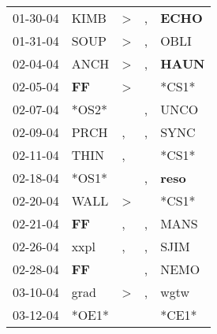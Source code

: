 \begin{supertabular}{p{0.07\textwidth}p{0.06\textwidth}p{0.02\textwidth}p{0.02\textwidth}p{0.06\textwidth}}
          01-30-04\textsuperscript{} &           KIMB\textsuperscript{} &     \textgreater &                , &  \textbf{ECHO\textsuperscript{}} \\
          01-31-04\textsuperscript{} &           SOUP\textsuperscript{} &     \textgreater &                , &           OBLI\textsuperscript{} \\
          02-04-04\textsuperscript{} &           ANCH\textsuperscript{} &     \textgreater &                , &  \textbf{HAUN\textsuperscript{}} \\
          02-05-04\textsuperscript{} &    \textbf{FF\textsuperscript{}} &     \textgreater &                  &                            *CS1* \\
          02-07-04\textsuperscript{} &                            *OS2* &                  &                , &           UNCO\textsuperscript{} \\
          02-09-04\textsuperscript{} &           PRCH\textsuperscript{} &                , &                , &           SYNC\textsuperscript{} \\
          02-11-04\textsuperscript{} &           THIN\textsuperscript{} &                , &                  &                            *CS1* \\
          02-18-04\textsuperscript{} &                            *OS1* &                  &                , &  \textbf{reso\textsuperscript{}} \\
          02-20-04\textsuperscript{} &           WALL\textsuperscript{} &     \textgreater &                  &                            *CS1* \\
          02-21-04\textsuperscript{} &    \textbf{FF\textsuperscript{}} &                , &                , &           MANS\textsuperscript{} \\
          02-26-04\textsuperscript{} &           xxpl\textsuperscript{} &                , &                , &           SJIM\textsuperscript{} \\
          02-28-04\textsuperscript{} &    \textbf{FF\textsuperscript{}} &                  &                , &           NEMO\textsuperscript{} \\
          03-10-04\textsuperscript{} &           grad\textsuperscript{} &     \textgreater &                , &           wgtw\textsuperscript{} \\
          03-12-04\textsuperscript{} &                            *OE1* &                  &                  &                            *CE1* \\

\end{supertabular}

